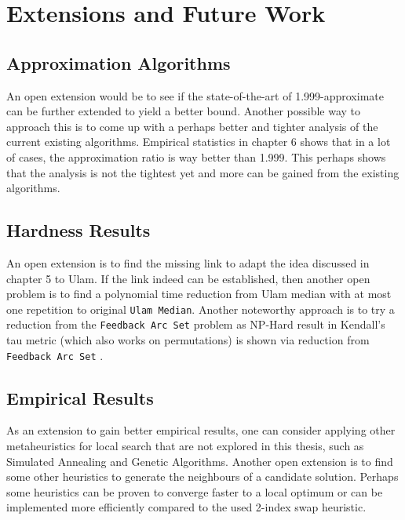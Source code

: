 \chapter{Extensions and Future Work}

\section{Approximation Algorithms}
An open extension would be to see if the state-of-the-art of 1.999-approximate can be further extended to yield a better bound. Another possible way to approach this is to come up with a perhaps better and tighter analysis of the current existing algorithms. Empirical statistics in chapter 6 shows that in a lot of cases, the approximation ratio is way better than 1.999. This perhaps shows that the analysis is not the tightest yet and more can be gained from the existing algorithms.

\section{Hardness Results}
An open extension is to find the missing link to adapt the idea discussed in chapter 5 to Ulam. If the link indeed can be established, then another open problem is to find a polynomial time reduction from Ulam median with at most one repetition to original \texttt{Ulam Median}. Another noteworthy approach is to try a reduction from the \texttt{Feedback Arc Set} problem as NP-Hard result in Kendall's tau metric (which also works on permutations) is shown via reduction from \texttt{Feedback Arc Set} \cite{KendallHard}.

\section{Empirical Results}
As an extension to gain better empirical results, one can consider applying other metaheuristics for local search that are not explored in this thesis, such as Simulated Annealing and Genetic Algorithms. Another open extension is to find some other heuristics to generate the neighbours of a candidate solution. Perhaps some heuristics can be proven to converge faster to a local optimum or can be implemented more efficiently compared to the used 2-index swap heuristic.
